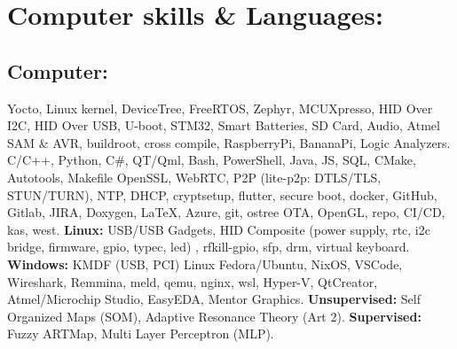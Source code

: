 \documentclass[article]{moderncv}
\begin{document}
\section{Computer skills \& Languages:}
\subsection{Computer:}
%
{Yocto, Linux kernel, DeviceTree, FreeRTOS, Zephyr, MCUXpresso, HID Over I2C, HID Over USB, U-boot, STM32, Smart Batteries, SD Card, Audio, Atmel SAM \& AVR, buildroot, cross compile, RaspberryPi, BananaPi, Logic Analyzers.}{}{}{}
%
{C/C++, Python, C\#, QT/Qml, Bash, PowerShell, Java, JS, SQL, CMake, Autotools, Makefile}{}{}{}
%
{OpenSSL, WebRTC, P2P (lite-p2p: DTLS/TLS, STUN/TURN), NTP, DHCP, cryptsetup, flutter, secure boot, docker, GitHub, Gitlab, JIRA, Doxygen, \LaTeX, Azure, git, ostree OTA, OpenGL, repo, CI/CD, kas, west.}{}{}{}
%
{\textbf{Linux:} USB/USB Gadgets, HID Composite (power supply, rtc, i2c bridge, firmware, gpio, typec, led) , rfkill-gpio, sfp, drm, virtual keyboard. 
\textbf{Windows:} KMDF (USB, PCI)}{}{}{}
%
{Linux Fedora/Ubuntu, NixOS, VSCode, Wireshark, Remmina, meld, qemu, nginx, wsl, Hyper-V, QtCreator, Atmel/Microchip Studio, EasyEDA, Mentor Graphics.}{}{}{}
%
{\textbf{Unsupervised:} Self Organized Maps (SOM), Adaptive Resonance Theory (Art 2).  \textbf{Supervised:} Fuzzy ARTMap, Multi Layer Perceptron (MLP).}{}{}{}
\end{document}
